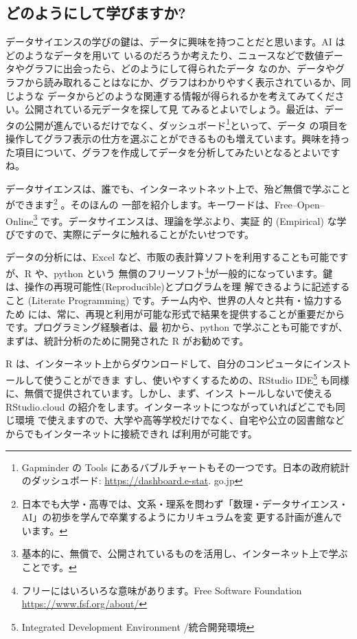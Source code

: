 \documentclass[
]{bxjsbook}
\theoremstyle{definition}
\theoremstyle{definition}
\theoremstyle{definition}
\theoremstyle{definition}
\theoremstyle{remark}
\begin{document}
\hypertarget{ux3069ux306eux3088ux3046ux306bux3057ux3066ux5b66ux3073ux307eux3059ux304b}{%
\subsection{どのようにして学びますか?}\label{ux3069ux306eux3088ux3046ux306bux3057ux3066ux5b66ux3073ux307eux3059ux304b}}

データサイエンスの学びの鍵は、データに興味を持つことだと思います。AI はどのようなデータを用いて いるのだろうか考えたり、ニュースなどで数値データやグラフに出会ったら、どのようにして得られたデータ なのか、データやグラフから読み取れることはなにか、グラフはわかりやすく表示されているか、同じような データからどのような関連する情報が得られるかを考えてみてください。公開されている元データを探して見 てみるとよいでしょう。最近は、データの公開が進んでいるだけでなく、ダッシュボード\footnote{Gapminder の Tools にあるバブルチャートもその一つです。日本の政府統計のダッシュボード: \url{https://dashboard.e-stat}.
  go.jp}といって、データ の項目を操作してグラフ表示の仕方を選ぶことができるものも増えています。興味を持った項目について、グラフを作成してデータを分析してみたいとなるとよいですね。

データサイエンスは、誰でも、インターネットネット上で、殆ど無償で学ぶことができます\footnote{日本でも大学・高専では、文系・理系を問わず「数理・データサイエンス・AI」の初歩を学んで卒業するようにカリキュラムを変 更する計画が進んでいます。} 。そのほんの
一部を紹介します。キーワードは、Free--Open--Online\footnote{基本的に、無償で、公開されているものを活用し、インターネット上で学ぶことです。} です。データサイエンスは、理論を学ぶより、実証 的 (Empirical) な学びですので、実際にデータに触れることがたいせつです。

データの分析には、Excel など、市販の表計算ソフトを利用することも可能ですが、R や、python という 無償のフリーソフト\footnote{フリーにはいろいろな意味があります。Free Software Foundation \url{https://www.fsf.org/about/}}が一般的になっています。鍵は、操作の再現可能性(Reproducible)とプログラムを理 解できるように記述すること (Literate Programming) です。チーム内や、世界の人々と共有・協力するため には、常に、再現と利用が可能な形式で結果を提供することが重要だからです。プログラミング経験者は、最 初から、python で学ぶことも可能ですが、まずは、統計分析のために開発された R がお勧めです。

R は、インターネット上からダウンロードして、自分のコンピュータにインストールして使うことができま すし、使いやすくするための、RStudio IDE\footnote{Integrated Development Environment /統合開発環境} も同様に、無償で提供されています。しかし、まず、インス トールしないで使える RStudio.cloud の紹介をします。インターネットにつながっていればどこでも同じ環境 で使えますので、大学や高等学校だけでなく、自宅や公立の図書館などからでもインターネットに接続できれ ば利用が可能です。
\end{document}
